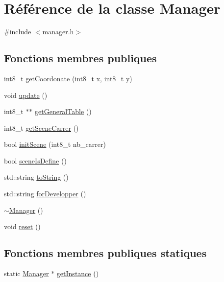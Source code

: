 \hypertarget{classManager}{\section{Référence de la classe Manager}
\label{classManager}
}


{\ttfamily \#include $<$manager.\-h$>$}

\subsection*{Fonctions membres publiques}
\begin{DoxyCompactItemize}
\item 
int8\-\_\-t \hyperlink{classManager_ad8d432cd5aa2863d355d2e39d1936861}{get\-Coordonate} (int8\-\_\-t x, int8\-\_\-t y)
\item 
void \hyperlink{classManager_af43da42550bd9746c5ea61a6aeee80de}{update} ()
\item 
int8\-\_\-t $\ast$$\ast$ \hyperlink{classManager_a963d327a438d93b100ff68b475d2cf83}{get\-General\-Table} ()
\item 
int8\-\_\-t \hyperlink{classManager_a18e77e06ef097db9e010835e7930bd3f}{get\-Scene\-Carrer} ()
\item 
bool \hyperlink{classManager_a24a0a31be841d8707708874486cb1b7c}{init\-Scene} (int8\-\_\-t nb\-\_\-carrer)
\item 
bool \hyperlink{classManager_aefac99ec14dd548faef966c858f3f78e}{scene\-Is\-Define} ()
\item 
std\-::string \hyperlink{classManager_abfd21eccf46a73165312fb71293affc3}{to\-String} ()
\item 
std\-::string \hyperlink{classManager_a21b3e54cbe4b045b9ac40ee53e403897}{for\-Developper} ()
\item 
\hyperlink{classManager_a322cad25d7007438b3a043ad02253d29}{$\sim$\-Manager} ()
\item 
void \hyperlink{classManager_a8cb433965677ad622ee43d59e24262e7}{reset} ()
\end{DoxyCompactItemize}
\subsection*{Fonctions membres publiques statiques}
\begin{DoxyCompactItemize}
\item 
static \hyperlink{classManager}{Manager} $\ast$ \hyperlink{classManager_a5d783bd86e9be93235898a46de80847f}{get\-Instance} ()
\end{DoxyCompactItemize}
